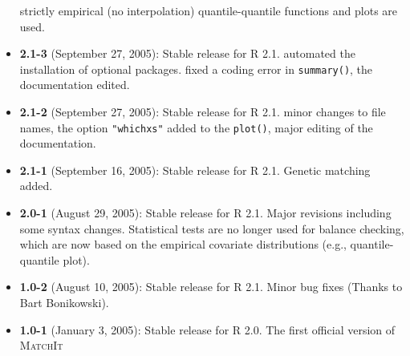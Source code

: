\documentclass[oneside,letterpaper,12pt]{book}
\newcommand{\MatchIt}{\textsc{MatchIt}}
\begin{document}
\begin{itemize}
  strictly empirical (no interpolation) quantile-quantile functions
  and plots are used.
\item \textbf{2.1-3} (September 27, 2005): Stable release for R 2.1.
  automated the installation of optional packages. fixed a coding
  error in {\tt summary()}, the documentation edited.
\item \textbf{2.1-2} (September 27, 2005): Stable release for R 2.1.
  minor changes to file names, the option {\tt "whichxs"} added to the
  {\tt plot()}, major editing of the documentation.
\item \textbf{2.1-1} (September 16, 2005): Stable release for R
        2.1. Genetic matching added.    
\item \textbf{2.0-1} (August 29, 2005): Stable release for R 2.1.
  Major revisions including some syntax changes. Statistical tests are
  no longer used for balance checking, which are now based on the
  empirical covariate distributions (e.g., quantile-quantile plot).
\item \textbf{1.0-2} (August 10, 2005): Stable release for R
  2.1. Minor bug fixes (Thanks to Bart Bonikowski).
\item \textbf{1.0-1} (January 3, 2005): Stable release for R 2.0. The
  first official version of \MatchIt
\end{itemize}



\clearpage



\end{document}
